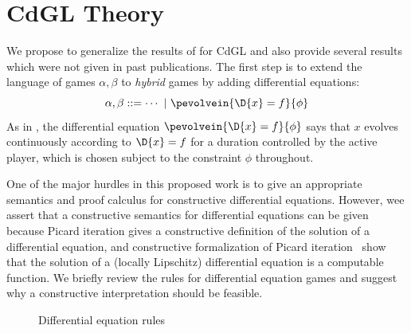 \documentclass[12pt]{cmuthesis}
\theoremstyle{definition}
\theoremstyle{remark}
\newcommand{\rref}[2][]{\prettyref{#2}}
\newcommand{\lequiv}{\leftrightarrow}
\newcommand{\CGL}{\textsf{CGL}\xspace}
\newcommand{\CdGL}{\textsf{CdGL}\xspace}
\begin{document}
\section{\CdGL Theory}
We propose to generalize the results of \rref{ch:cgl} for \CdGL and also provide several results which were not given in past publications.
The first step is to extend the language of games $\alpha,\beta$ to \emph{hybrid} games by adding differential equations:
\[\alpha,\beta ::= \cdots\ |\ \pevolvein{\D{x}=f}{\phi}\]
As in \dGL, the differential equation $\pevolvein{\D{x}=f}{\phi}$ says that $x$ evolves continuously according to $\D{x}=f$ for a duration controlled by the active player, which is chosen subject to the constraint $\phi$ throughout.

One of the major hurdles in this proposed work is to give an appropriate semantics and proof calculus for constructive differential equations.
However, wee assert that a constructive semantics for differential equations can be given because Picard iteration gives a constructive definition of the solution of a differential equation, and constructive formalization of Picard iteration~\cite{DBLP:journals/corr/abs-11063-448,Krebbers+Spitters:lmcs:corn:2011} show that the solution of a (locally Lipschitz) differential equation is a computable function.
We briefly review the \dGL rules for differential equation games and suggest why a constructive interpretation should be feasible.
\begin{figure}
  \centering
  \begin{calculuscollections}{\columnwidth}
    \begin{calculus}
{
}{}
\cinferenceRule[dglweak|DW]{}
{
}{}
\cinferenceRule[dglcut|DC]{}
{
\linferenceRule[lpmi]{\dbox{\pevolvein{\D{x}=f}{\psi}}{\phi}\lequiv \dbox{\pevolvein{\D{x}=f}{\psi \land \rho}}{\phi}}{\dbox{\pevolvein{\D{x}=f}{\psi}}{\rho}}
}{}
\cinferenceRule[dglind|DI]{}
{
}{}
\cinferenceRule[dglghost|DG]{}
{
}{}
\cinferenceRule[dglconst|DS]{}
{
}{}
\cinferenceRule[dglvariant|DV]{}
{
}{}
\end{calculus}
\end{calculuscollections}
\caption{Differential equation rules}
\label{fig:diffeq-rules}
\end{figure}
\end{document}
